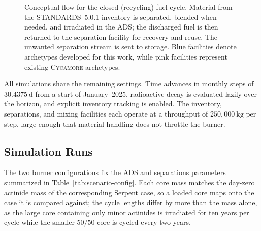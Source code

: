 \begin{figure}
{%
}
\caption[Recycling fuel cycle flowsheet.]{Conceptual flow for the closed
(recycling) fuel cycle. Material from the \gls{STANDARDS}~5.0.1 inventory is
separated, blended when needed, and irradiated in the \gls{ADS}; the discharged
fuel is then returned to the separation facility for recovery and reuse. The
unwanted separation stream is sent to storage. Blue facilities denote
archetypes developed for this work, while pink facilities represent existing
\textsc{Cycamore} archetypes.}
\label{fig:flowsheet-recycle}
\end{figure}

All simulations share the remaining settings. Time advances in monthly steps of
\(30.4375~\mathrm{d}\) from a start of January~2025, radioactive decay is
evaluated lazily over the horizon, and explicit inventory tracking is enabled.
The inventory, separations, and mixing facilities each operate at a throughput of
\(250{,}000~\mathrm{kg}\) per step, large enough that material handling does not
throttle the burner.

\subsection{Simulation Runs}
\label{subsec:scenario-runs}

The two burner configurations fix the \gls{ADS} and separations parameters
summarized in Table~\ref{tab:scenario-config}. Each core mass matches the
day-zero actinide mass of the corresponding Serpent case, so a loaded core maps
onto the case it is compared against; the cycle lengths differ by more than the
mass alone, as the large core containing only minor actinides is irradiated
for ten years per cycle while the smaller \(50/50\) core is cycled every two years.

